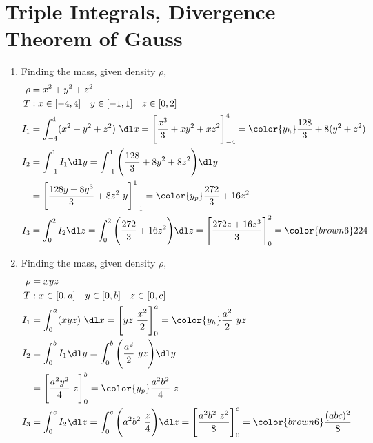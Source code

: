 \section{Triple Integrals, Divergence Theorem of Gauss}

\begin{enumerate}
     \item Finding the mass, given density $ \rho $,
           \begin{align}
                \rho & = x^2 + y^2 + z^2                                        \\
                T    & : x \in [-4, 4] \quad y \in [-1, 1] \quad z \in [0, 2]   \\
                I_1  & = \int_{-4}^{4} (x^2 + y^2 + z^2)\ \dl x
                = \Bigg[ \frac{x^3}{3} + xy^2 + xz^2 \Bigg]_{-4}^{4}
                = {\color{y_h} \frac{128}{3} + 8(y^2 + z^2)}                    \\
                I_2  & = \int_{-1}^{1}I_1 \dl y = \int_{-1}^{1}
                \Bigg(\frac{128}{3} + 8y^2 + 8z^2\Bigg) \dl y                   \\
                     & = \Bigg[ \frac{128y + 8y^3}{3} + 8z^2\ y \Bigg]_{-1}^{1}
                = {\color{y_p} \frac{272}{3} + 16z^2}                           \\
                I_3  & = \int_{0}^{2} I_2 \dl z = \int_{0}^{2}
                \Bigg( \frac{272}{3} + 16z^2 \Bigg) \dl z
                = \Bigg[ \frac{272 z + 16 z^3}{3} \Bigg]_0^2
                = {\color{brown6} 224}
           \end{align}

     \item Finding the mass, given density $ \rho $,
           \begin{align}
                \rho & = xyz                                                \\
                T    & : x \in [0, a] \quad y \in [0, b] \quad z \in [0, c] \\
                I_1  & = \int_{0}^{a} (xyz)\ \dl x
                = \Bigg[ yz\ \frac{x^2}{2} \Bigg]_{0}^{a}
                = {\color{y_h} \frac{a^2}{2}\ yz}                           \\
                I_2  & = \int_{0}^{b}I_1 \dl y = \int_{0}^{b}
                \Bigg( \frac{a^2}{2}\ yz \Bigg) \dl y                       \\
                     & = \Bigg[ \frac{a^2y^2}{4}\ z \Bigg]_{0}^{b}
                = {\color{y_p} \frac{a^2b^2}{4}\ z}                         \\
                I_3  & = \int_{0}^{c} I_2 \dl z = \int_{0}^{c}
                \Bigg( a^2 b^2\ \frac{z}{4} \Bigg) \dl z
                = \Bigg[ \frac{a^2b^2\ z^2}{8} \Bigg]_0^c
                = {\color{brown6} \frac{(abc)^2}{8}}
           \end{align}


\end{enumerate}
